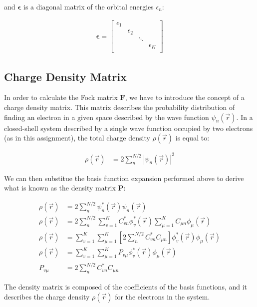\documentclass[10pt, oneside, letterpaper]{article}
\begin{document}
and $\bm{\epsilon}$ is a diagonal matrix of the orbital energies $\epsilon_n$:

\begin{align*}
\bm{\epsilon} =
\begin{bmatrix}
 \epsilon_1 &            &        & \\
            & \epsilon_2 &        & \\
            &            & \ddots & \\
            &            &        & \epsilon_K\\
\end{bmatrix}
\end{align*}

\subsection{Charge Density Matrix}

In order to calculate the Fock matrix $\bm{F}$, we have to introduce the concept of a charge density matrix. This matrix describes the probability distribution of finding an electron in a given space described by the wave function $\psi_n(\vec{r})$. In a closed-shell system described by a single wave function occupied by two electrons (as in this assignment), the total charge density $\rho(\vec{r})$ is equal to:

\begin{align*}
\rho(\vec{r}) &= 2 \sum_{n}^{N/2}\left|\psi_n(\vec{r})\right|^2
\end{align*}

We can then substitue the basis function expansion performed above to derive what is known as the density matrix $\bm{P}$:

\begin{align*}
\rho(\vec{r}) &= 2 \sum_{n}^{N/2}\psi_n^\ast(\vec{r})\psi_n(\vec{r}) \\
\rho(\vec{r}) &= 2 \sum_{n}^{N/2}\sum_{v = 1}^K C_{v n}^\ast\phi_v^\ast(\vec{r})\sum_{\mu = 1}^K C_{\mu n}\phi_\mu(\vec{r}) \\
\rho(\vec{r}) &= \sum_{v = 1}^K\sum_{\mu = 1}^K \left[ 2 \sum_{n}^{N/2} C_{v n}^\ast C_{\mu n} \right] \phi_v^\ast(\vec{r}) \phi_\mu(\vec{r}) \\
\rho(\vec{r}) &= \sum_{v = 1}^K\sum_{\mu = 1}^K P_{v\mu} \phi_v^\ast(\vec{r})\phi_\mu(\vec{r}) \\
P_{v\mu} &= 2 \sum_{n}^{N/2} C_{v n}^\ast C_{\mu n}
\end{align*}

The density matrix is composed of the coefficients of the basis functions, and it describes the charge density $\rho(\vec{r})$ for the electrons in the system.
\end{document}
